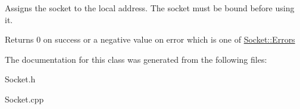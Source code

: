 Assigns the socket to the local address. The socket must be bound before using it. 

\begin{DoxyReturn}{Returns}
0 on success or a negative value on error which is one of \hyperlink{classSocket_a9f68308228badcdd299cd83e62e36976}{Socket\-::\-Errors} 
\end{DoxyReturn}


The documentation for this class was generated from the following files\-:\begin{DoxyCompactItemize}
\item 
Socket.\-h\item 
Socket.\-cpp\end{DoxyCompactItemize}
